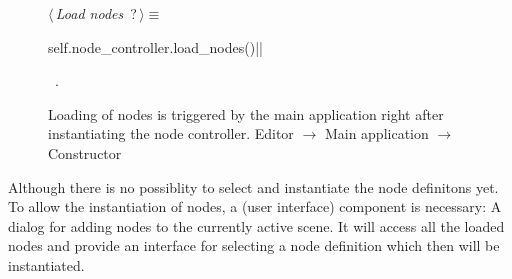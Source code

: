 \documentclass[%
    a4paper,    %
    justified,  %
    nobib,      %
    openany     %
]{tufte-book}
\begin{document}
\begin{figure}
\begin{flushleft} \small
\begin{minipage}{\linewidth}\label{scrap147}\raggedright\small
{} $\langle\,${\itshape Load nodes}\nobreak\ {\footnotesize {?}}$\,\rangle\equiv$
\vspace{-1ex}
\begin{pythoncode}
self.node_controller.load_nodes()|\NWsep|
\end{pythoncode}
\vspace{1.5ex}
\footnotesize
\begin{list}{}{\setlength{\itemsep}{-\parsep}\setlength{\itemindent}{-\leftmargin}}
\item \NWtxtMacroRefIn\ .

\item{}
\end{list}
\end{minipage}\vspace{4ex}
\end{flushleft}
\caption{Loading of nodes is triggered by the main application right after
  instantiating the node controller.
  \newline{}\newline{}Editor $\rightarrow$ Main application $\rightarrow$
  Constructor}
\label{editor:lst:main-application:constructor:load-nodes}
\end{figure}

 Although there is
no possiblity to select and instantiate the node definitons yet. To allow the
instantiation of nodes, a (user interface) component is necessary: A dialog for
adding nodes to the currently active scene. It will access all the loaded nodes
and provide an interface for selecting a node definition which then will be
instantiated.
\end{document}
